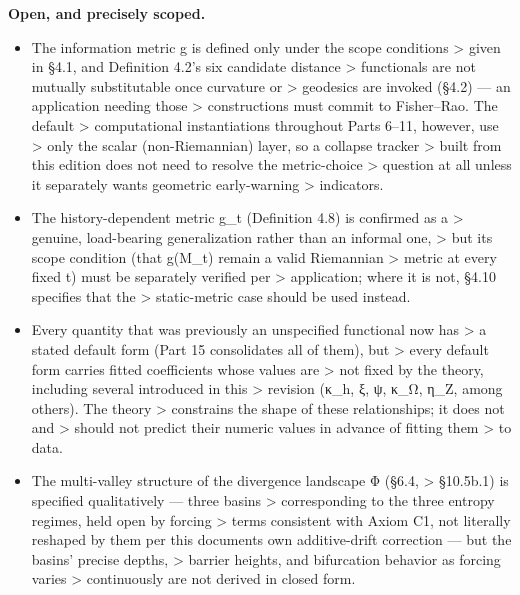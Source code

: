 \documentclass[
]{article}
\begin{document}
\textbf{Open, and precisely scoped.}

\begin{itemize}
\item
  The information metric g is defined only under the scope conditions
  \textgreater{} given in §4.1, and Definition 4.2's six candidate
  distance \textgreater{} functionals are not mutually substitutable
  once curvature or \textgreater{} geodesics are invoked (§4.2) --- an
  application needing those \textgreater{} constructions must commit to
  Fisher--Rao. The default \textgreater{} computational instantiations
  throughout Parts 6--11, however, use \textgreater{} only the scalar
  (non-Riemannian) layer, so a collapse tracker \textgreater{} built
  from this edition does not need to resolve the metric-choice
  \textgreater{} question at all unless it separately wants geometric
  early-warning \textgreater{} indicators.
\item
  The history-dependent metric g\_t (Definition 4.8) is confirmed as a
  \textgreater{} genuine, load-bearing generalization rather than an
  informal one, \textgreater{} but its scope condition (that g(M\_t)
  remain a valid Riemannian \textgreater{} metric at every fixed t) must
  be separately verified per \textgreater{} application; where it is
  not, §4.10 specifies that the \textgreater{} static-metric case should
  be used instead.
\item
  Every quantity that was previously an unspecified functional now has
  \textgreater{} a stated default form (Part 15 consolidates all of
  them), but \textgreater{} every default form carries fitted
  coefficients whose values are \textgreater{} not fixed by the theory,
  including several introduced in this \textgreater{} revision (κ\_h, ξ,
  ψ, κ\_Ω, η\_Z, among others). The theory \textgreater{} constrains the
  shape of these relationships; it does not and \textgreater{} should
  not predict their numeric values in advance of fitting them
  \textgreater{} to data.
\item
  The multi-valley structure of the divergence landscape Φ (§6.4,
  \textgreater{} §10.5b.1) is specified qualitatively --- three basins
  \textgreater{} corresponding to the three entropy regimes, held open
  by forcing \textgreater{} terms consistent with Axiom C1, not
  literally reshaped by them per this document\textquotesingle s own
  additive-drift correction --- but the basins' precise depths,
  \textgreater{} barrier heights, and bifurcation behavior as forcing
  varies \textgreater{} continuously are not derived in closed form.

\end{itemize}
\end{document}
